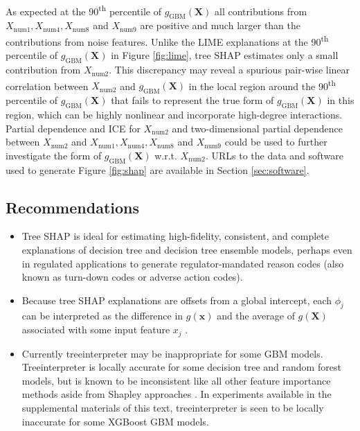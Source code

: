 \documentclass[sigconf, review]{acmart}
\begin{document}
As expected at the 90\textsuperscript{th} percentile of $g_{\text{GBM}}(\mathbf{X})$ all contributions from $X_{\text{num}1}, X_{\text{num}4}, X_{\text{num}8}$ and $X_{\text{num}9}$ are positive and much larger than the contributions from noise features. Unlike the LIME explanations at the 90\textsuperscript{th} percentile of $g_{\text{GBM}}(\mathbf{X})$ in Figure \ref{fig:lime}, tree SHAP estimates only a small contribution from $X_{\text{num}2}$. This discrepancy may reveal a spurious pair-wise linear correlation between $X_{\text{num}2}$ and $g_{\text{GBM}}(\mathbf{X})$ in the local region around the 90\textsuperscript{th} percentile of $g_{\text{GBM}}(\mathbf{X})$ that fails to represent the true form of $g_{\text{GBM}}(\mathbf{X})$ in this region, which can be highly nonlinear and incorporate high-degree interactions. Partial dependence and ICE for $X_{\text{num}2}$ and two-dimensional partial dependence between $X_{\text{num}2}$ and $X_{\text{num}1}, X_{\text{num}4}, X_{\text{num}8}$ and $X_{\text{num}9}$ could be used to further investigate the form of $g_{\text{GBM}}(\mathbf{X})$ w.r.t. $X_{\text{num}2}$. URLs to the data and software used to generate Figure \ref{fig:shap} are available in Section \ref{sec:software}.

\subsection{Recommendations}

\begin{itemize}
	
	\item Tree SHAP is ideal for estimating high-fidelity, consistent, and complete explanations of decision tree and decision tree ensemble models, perhaps even in regulated applications to generate regulator-mandated reason codes (also known as turn-down codes or adverse action codes).
	
	\item Because tree SHAP explanations are offsets from a global intercept, each $\phi_j$ can be interpreted as the difference in $g(\mathbf{x})$ and the average of $g(\mathbf{X})$ associated with some input feature $x_j$ \cite{molnar}. 
		
	\item Currently treeinterpreter may be inappropriate for some GBM models. Treeinterpreter is locally accurate for some decision tree and random forest models, but is known to be inconsistent like all other feature importance methods aside from Shapley approaches \cite{tree_shap}. In experiments available in the supplemental materials of this text, treeinterpreter is seen to be locally inaccurate for some XGBoost GBM models. 
	
\end{itemize}
\end{document}
